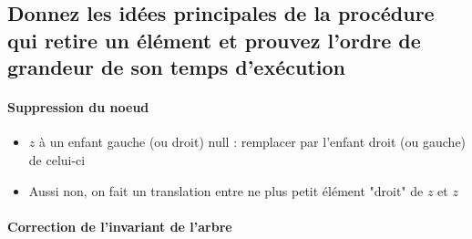 \documentclass[11pt]{article}
\begin{document}
\subsection{Donnez les idées principales de la procédure qui retire un élément et prouvez l'ordre de grandeur de son temps d'exécution}

\paragraph{Suppression du noeud}

\begin{itemize}
	\item $z$ à un enfant gauche (ou droit) null : remplacer par l'enfant droit (ou gauche) de celui-ci
	\item Aussi non, on fait un translation entre ne plus petit élément "droit" de $z$ et $z$
\end{itemize}

\paragraph{Correction de l'invariant de l'arbre}
\end{document}
